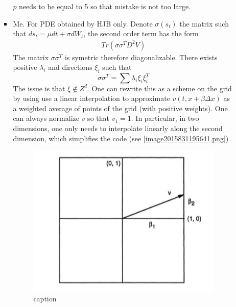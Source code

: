 \documentclass[english]{article}
\begin{document}
\begin{itemize}
\begin{itemize}
\begin{itemize}
			$p$ needs to be equal to 5 so that mistake is not too large.
			\item Me. For PDE obtained by HJB only. Denote $\sigma(s_t)$ the matrix such that $ds_t = \mu dt + \sigma dW_t$, the second order term has the form 
			\begin{align*}
				Tr(\sigma\sigma^TD^2V)
			\end{align*}
			The matrix $\sigma\sigma^T$ is symetric therefore diagonalizable. There exists positive $\lambda_i$ and directions $\xi_i$ such that
			$$\sigma\sigma^T = \sum \lambda_i \xi_i \xi_i^T$$ 
			The issue is that $\xi \notin Z^d$. One can rewrite this as a scheme on the grid by using use a linear interpolation to approximate $v(t, x+\beta \Delta x) $ as a weighted average of points of the grid (with positive weights). 
			One can always normalize $v$ so that $v_1 = 1$. In particular, in two dimensions, one only needs to interpolate linearly along the second dimension, which simplifies the code (see \autoref{image2015831195641.png})
			\begin{figure}[htp]
				\centering
				\includegraphics[width=4in]{image2015831195641.png}
				\caption{\label{image2015831195641.png}caption}
			\end{figure}
		\end{itemize}
	\end{itemize}
\end{itemize}
\end{document}
